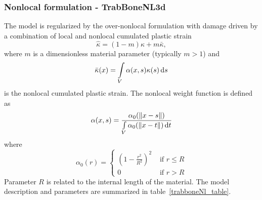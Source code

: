 \documentclass[a4paper]{article}
\begin{document}
\subsubsection{Nonlocal formulation - TrabBoneNL3d}
The model is regularized by the over-nonlocal formulation with damage driven by a combination of local and nonlocal cumulated plastic strain
\begin{equation}\label{overKappa}
\hat{\kappa} = (1-m)\kappa + m\bar{\kappa},
\end{equation}
where $m$ is a dimensionless material parameter (typically $m>1$) and
\begin{equation}\label{nonLocalPlStrain}
\bar{\kappa}(x) = \int\limits_V \alpha(x,s)\kappa(s)\,{\rm d}s
\end{equation}
is the nonlocal cumulated plastic strain. The nonlocal weight function is defined as
\begin{equation}
\alpha(x,s) = \frac{\alpha_0(\Vert x-s\Vert )}{\int\limits_V\alpha_0(\Vert x-t\Vert )\,{\rm d}t}
\end{equation}
where
\begin{equation}
\alpha_0(r) =\left\{\begin{array}{cc} \left(1-\frac{r^2}{R^2}\right)^2 & \mbox{ if } r\le R \\ 0 & \mbox{ if } r> R \end{array}\right.
\end{equation}
Parameter $R$ is related to the internal length of the material.
The model description and parameters are summarized in table~\ref{trabboneNl_table}.
\end{document}
